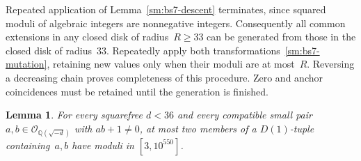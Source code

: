 \documentclass[12pt]{article}
\newtheorem{lemma}[theorem]{Lemma}
\numberwithin{equation}{section}
\begin{document}
Repeated application of Lemma~\ref{sm:bs7-descent} terminates, since squared moduli of algebraic integers are nonnegative integers. Consequently all common extensions in any closed disk of radius~$R\ge33$ can be generated from those in the closed disk of radius~$33$. Repeatedly apply both transformations~\eqref{sm:bs7-mutation}, retaining new values only when their moduli are at most~$R$. Reversing a decreasing chain proves completeness of this procedure. Zero and anchor coincidences must be retained until the generation is finished.

\begin{lemma}\label{sm:bs7-finite-pairs}
For every squarefree $d<36$ and every compatible small pair $a,b\in\mathcal O_{\mathbb Q(\sqrt{-d})}$ with $ab+1\ne0$, at most two members of a $D(1)$-tuple containing~$a,b$ have moduli in $[3,10^{550}]$.
\end{lemma}
\end{document}
